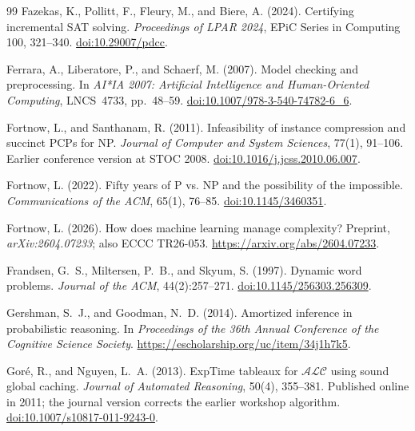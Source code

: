 \documentclass[11pt,a4paper]{article}
\numberwithin{equation}{section}
\theoremstyle{plain}
\theoremstyle{definition}
\theoremstyle{remark}
\begin{document}
\begin{thebibliography}{99}
Fazekas, K., Pollitt, F., Fleury, M., and Biere, A. (2024).
Certifying incremental SAT solving.
\emph{Proceedings of LPAR 2024}, EPiC Series in Computing 100, 321--340.
\href{https://doi.org/10.29007/pdcc}{doi:10.29007/pdcc}.

Ferrara, A., Liberatore, P., and Schaerf, M. (2007).
Model checking and preprocessing.
In \emph{AI*IA 2007: Artificial Intelligence and Human-Oriented Computing}, LNCS~4733, pp.~48--59.
\href{https://doi.org/10.1007/978-3-540-74782-6_6}{doi:10.1007/978-3-540-74782-6\_6}.

Fortnow, L., and Santhanam, R. (2011).
Infeasibility of instance compression and succinct PCPs for NP.
\emph{Journal of Computer and System Sciences}, 77(1), 91--106.
Earlier conference version at STOC 2008.
\href{https://doi.org/10.1016/j.jcss.2010.06.007}{doi:10.1016/j.jcss.2010.06.007}.

Fortnow, L. (2022).
Fifty years of P vs. NP and the possibility of the impossible.
\emph{Communications of the ACM}, 65(1), 76--85.
\href{https://doi.org/10.1145/3460351}{doi:10.1145/3460351}.

Fortnow, L. (2026).
How does machine learning manage complexity?
Preprint, \emph{arXiv:2604.07233}; also ECCC TR26-053.
\url{https://arxiv.org/abs/2604.07233}.

Frandsen, G.~S., Miltersen, P.~B., and Skyum, S. (1997).
Dynamic word problems. \emph{Journal of the ACM}, 44(2):257--271.
\href{https://doi.org/10.1145/256303.256309}{doi:10.1145/256303.256309}.

Gershman, S.~J., and Goodman, N.~D. (2014).
Amortized inference in probabilistic reasoning.
In \emph{Proceedings of the 36th Annual Conference of the Cognitive Science Society}.
\url{https://escholarship.org/uc/item/34j1h7k5}.

Gor\'e, R., and Nguyen, L.~A. (2013).
ExpTime tableaux for $\mathcal{ALC}$ using sound global caching.
\emph{Journal of Automated Reasoning}, 50(4), 355--381.
Published online in 2011; the journal version corrects the earlier workshop algorithm.
\href{https://doi.org/10.1007/s10817-011-9243-0}{doi:10.1007/s10817-011-9243-0}.


\end{thebibliography}
\end{document}
